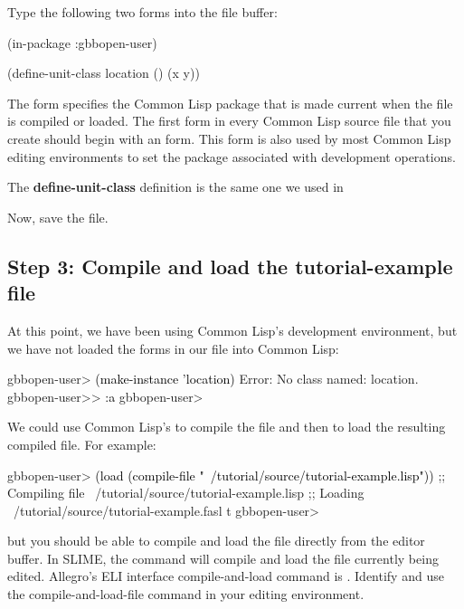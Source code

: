 \documentclass[10pt,twoside,english,pdftex]{article}
\begin{document}
Type the following two forms into the  file
buffer:
%
\W\supp
\begin{example}
  (in-package :gbbopen-user)

  (define-unit-class location ()
    (x y))
\end{example}

The  form specifies the Common Lisp package that is made
current when the file is compiled or loaded.  The first form in every Common
Lisp source file that you create should begin with an  form.
This form is also used by most Common Lisp editing environments to set the
package associated with development operations.

The \textbf{define-unit-class} definition is the same one we used in

Now, save the file.  

\subsection*{Step 3: Compile and load the tutorial-example file}

At this point, we have been using Common Lisp's
development environment, but we have not loaded the forms in our file
into Common Lisp:
%
\W\supp
\begin{example}
\textcolor{darkergray}{%
  gbbopen-user> \textcolor{black}{(make-instance 'location)}
  Error: No class named: location.
  gbbopen-user>> \textcolor{black}{:a}
  gbbopen-user>}
\end{example}

We could use Common Lisp's  to compile the file and
then  to load the resulting compiled file. For example:
%
\W\supp
\begin{example}
\textcolor{darkergray}{%
  gbbopen-user> \textcolor{black}{(load (compile-file "~/tutorial/source/tutorial-example.lisp"))}
  ;; Compiling file ~/tutorial/source/tutorial-example.lisp
  ;; Loading ~/tutorial/source/tutorial-example.fasl
  t
  gbbopen-user>}
\end{example}
%
but you should be able to compile and load the file directly from the
editor buffer.  In SLIME, the command  will compile and
load the file currently being edited.  Allegro's ELI interface
compile-and-load command is .  Identify and use the
compile-and-load-file command in your editing environment.
\end{document}
